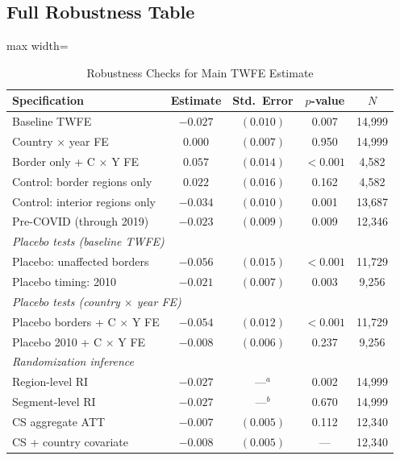 \documentclass[12pt]{article}
\begin{document}
\subsection{Full Robustness Table}

\begin{table}[H]
\centering
\caption{Robustness Checks for Main TWFE Estimate}
\label{tab:robustness}
\begin{adjustbox}{max width=\textwidth}
\begin{tabular}{lcccc}
\toprule
Specification & Estimate & Std.\ Error & $p$-value & $N$ \\
\midrule
Baseline TWFE & $-0.027$ & $(0.010)$ & 0.007 & 14,999 \\
Country $\times$ year FE & $0.000$ & $(0.007)$ & 0.950 & 14,999 \\
Border only + C $\times$ Y FE & $0.057$ & $(0.014)$ & $<0.001$ & 4,582 \\
Control: border regions only & $0.022$ & $(0.016)$ & 0.162 & 4,582 \\
Control: interior regions only & $-0.034$ & $(0.010)$ & 0.001 & 13,687 \\
Pre-COVID (through 2019) & $-0.023$ & $(0.009)$ & 0.009 & 12,346 \\
\midrule
\multicolumn{5}{l}{\textit{Placebo tests (baseline TWFE)}} \\
Placebo: unaffected borders & $-0.056$ & $(0.015)$ & $<0.001$ & 11,729 \\
Placebo timing: 2010 & $-0.021$ & $(0.007)$ & 0.003 & 9,256 \\
\multicolumn{5}{l}{\textit{Placebo tests (country $\times$ year FE)}} \\
Placebo borders + C $\times$ Y FE & $-0.054$ & $(0.012)$ & $<0.001$ & 11,729 \\
Placebo 2010 + C $\times$ Y FE & $-0.008$ & $(0.006)$ & 0.237 & 9,256 \\
\midrule
\multicolumn{5}{l}{\textit{Randomization inference}} \\
Region-level RI & $-0.027$ & ---$^{a}$ & 0.002 & 14,999 \\
Segment-level RI & $-0.027$ & ---$^{b}$ & 0.670 & 14,999 \\
\midrule
CS aggregate ATT & $-0.007$ & $(0.005)$ & 0.112 & 12,340 \\
CS + country covariate & $-0.008$ & $(0.005)$ & --- & 12,340 \\
\bottomrule
\end{tabular}
\end{adjustbox}

\end{table}
\end{document}
